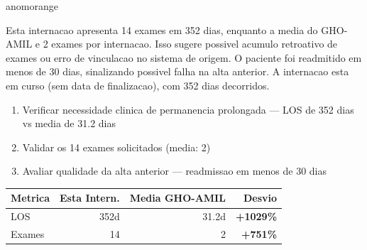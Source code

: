 \documentclass[a4paper,10pt]{article}
\begin{document}
\begin{anomalycard}[Internacao 3499 | GHO-AMIL | ALTO (z=4.12)]{anomorange}
\vspace{2pt}\begin{tcolorbox}[colback=severityred!20,colframe=anomorange,title={\textbf{Interpretacao de Negocio}},fonttitle=\bfseries\small,left=4pt,right=4pt,top=3pt,bottom=3pt]
{\small Esta internacao apresenta 14 exames em 352 dias, enquanto a media do GHO-AMIL e 2 exames por internacao. Isso sugere possivel acumulo retroativo de exames ou erro de vinculacao no sistema de origem. O paciente foi readmitido em menos de 30 dias, sinalizando possivel falha na alta anterior. A internacao esta em curso (sem data de finalizacao), com 352 dias decorridos.}
\end{tcolorbox}
\begin{tcolorbox}[colback=severityyellow!30,colframe=anomorange,title={\textbf{Recomendacoes Especificas}},fonttitle=\bfseries\small,left=4pt,right=4pt,top=3pt,bottom=3pt]
\begin{enumerate}[nosep,leftmargin=16pt]
\item {\small Verificar necessidade clinica de permanencia prolongada --- LOS de 352 dias vs media de 31.2 dias}
\item {\small Validar os 14 exames solicitados (media: 2)}
\item {\small Avaliar qualidade da alta anterior --- readmissao em menos de 30 dias}
\end{enumerate}
\end{tcolorbox}
\begin{center}\begin{tabular}{l r r r}\toprule\textbf{Metrica} & \textbf{Esta Intern.} & \textbf{Media GHO-AMIL} & \textbf{Desvio} \\\midrule
LOS & 352d & 31.2d & \textcolor{anomred}{\textbf{+1029\%}} \\
Exames & 14 & 2 & \textcolor{anomred}{\textbf{+751\%}} \\
\bottomrule\end{tabular}\end{center}


\end{anomalycard}
\end{document}
